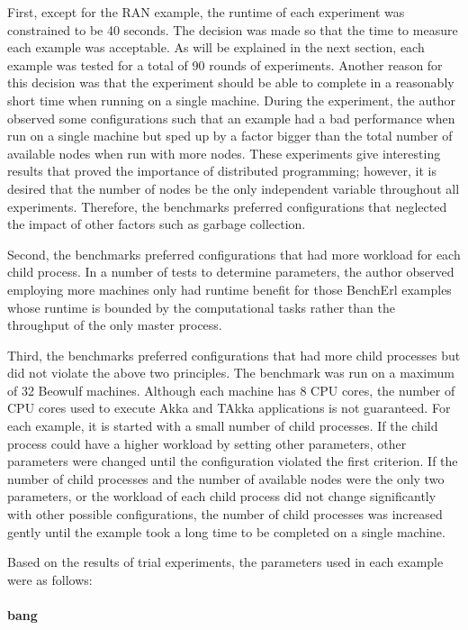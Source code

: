 First, except for the RAN example, the runtime of each experiment was 
constrained to be 40 seconds.  The decision was made so that the time to 
measure each example was acceptable.  As will be explained in the next 
section, each example was tested for a total of 90 rounds of experiments.  
Another reason for this decision was that the experiment should be able to 
complete in a reasonably short time when running on a single machine.  During 
the experiment, the author observed some configurations such that an example 
had a bad performance when run on a single machine but sped up by a factor 
bigger than the total number of available nodes when run with more nodes.  
These experiments give interesting results that proved the importance of 
distributed programming; however, it is desired that the number of nodes be the 
only independent variable throughout all experiments.  Therefore, the 
benchmarks preferred configurations that neglected the impact of other factors 
such as garbage collection.

Second, the benchmarks preferred configurations that had more workload for each 
child process. In a number of tests to determine parameters, the author 
observed employing more machines only had runtime benefit for those 
BenchErl examples whose runtime is bounded by the computational tasks rather 
than the throughput of the only master process.

Third, the benchmarks preferred configurations that had more child processes 
but did not violate the above two principles.  The benchmark was run on 
a maximum of 32 Beowulf machines.  Although each machine has 8 CPU cores, the 
number of CPU cores used to execute Akka and TAkka applications is not 
guaranteed.  For each example, it is started with a small number of child 
processes.  If the child process could have a higher workload by setting other 
parameters, other parameters were changed until the configuration violated the 
first criterion.  If the number of child processes and the number of available 
nodes were the only two parameters, or the workload of each child process did 
not change significantly with other possible configurations, the number of child 
processes was increased gently until the example took a long time to be 
completed on a single machine.

Based on the results of trial experiments, the parameters used in each 
example were as follows:

\paragraph{bang} 

